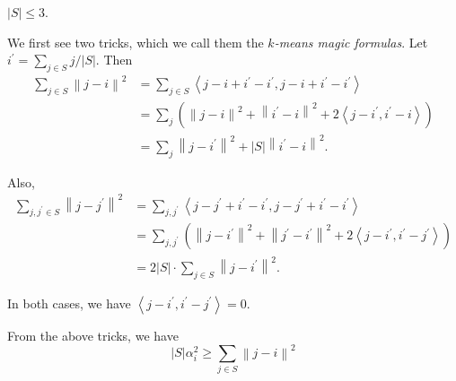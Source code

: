 \begin{claim}
	\(\left\vert S \right\vert \leq 3\).
\end{claim}
\begin{explanation}
	We first see two tricks, which we call them the \emph{\(k\)-means magic formulas}. Let \(i^\prime = \sum_{j\in S} j / \left\vert S \right\vert\). Then
	\[
		\begin{split}
			\sum_{j\in S} \left\lVert j - i\right\rVert ^{2}
			&= \sum_{j\in S} \left\langle j - i + i^\prime - i^\prime , j - i + i^\prime - i^\prime  \right\rangle \\
			&= \sum_{j} \left( \left\lVert j - i\right\rVert ^{2} + \left\lVert i^\prime - i\right\rVert ^{2} + 2\left\langle j - i^\prime , i^\prime - i \right\rangle  \right) \\
			&= \sum_{j} \left\lVert j - i^\prime \right\rVert ^{2} + \left\vert S \right\vert \left\lVert i^\prime - i\right\rVert ^{2} .
		\end{split}
	\]

	Also,
	\[
		\begin{split}
			\sum_{j, j^\prime \in S} \left\lVert j - j^\prime \right\rVert ^{2}
			&= \sum_{j, j^\prime }\left\langle j- j^\prime + i^\prime - i^\prime , j- j^\prime + i^\prime - i^\prime  \right\rangle  \\
			&= \sum_{j, j^\prime } \left( \left\lVert j - i^\prime \right\rVert^{2} + \left\lVert j^\prime - i^\prime \right\rVert ^{2} + 2 \left\langle j -i^\prime , i^\prime - j^\prime  \right\rangle   \right) \\
			&= 2\left\vert S \right\vert \cdot \sum_{j\in S} \left\lVert j - i^\prime \right\rVert ^{2} .
		\end{split}
	\]

	\begin{remark}
		In both cases, we have \(\left\langle j - i^\prime , i^\prime - j^\prime  \right\rangle = 0\).
	\end{remark}

	From the above tricks, we have
	\[
		\left\vert S \right\vert \alpha _i^{2} \geq \sum_{j\in S} \left\lVert j - i\right\rVert ^{2}
	\]
\end{explanation}
